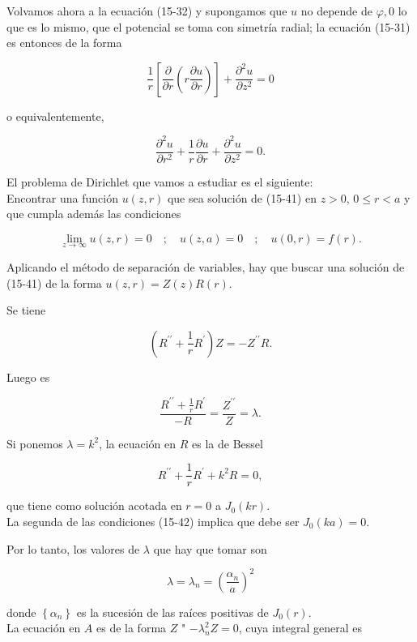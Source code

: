 \documentclass[10pt]{article}
\theoremstyle{plain}
\theoremstyle{definition}
\theoremstyle{remark}
\begin{document}
Volvamos ahora a la ecuación (15-32) y supongamos que $u$ no depende de $\varphi, 0$ lo que es lo mismo, que el potencial se toma con simetría radial; la ecuación (15-31) es entonces de la forma

$$
\frac{1}{r}\left[\frac{\partial}{\partial r}\left(r \frac{\partial u}{\partial r}\right)\right]+\frac{\partial^{2} u}{\partial z^{2}}=0
$$

o equivalentemente,


\begin{equation*}
\frac{\partial^{2} u}{\partial r^{2}}+\frac{1}{r} \frac{\partial u}{\partial r}+\frac{\partial^{2} u}{\partial z^{2}}=0 . \tag{15-41}
\end{equation*}


El problema de Dirichlet que vamos a estudiar es el siguiente:\\
Encontrar una función $u(z, r)$ que sea solución de (15-41) en $z>0$, $0 \leqslant r<a$ y que cumpla además las condiciones


\begin{equation*}
\lim _{z \rightarrow \infty} u(z, r)=0 \quad ; \quad u(z, a)=0 \quad ; \quad u(0, r)=f(r) . \tag{15-42}
\end{equation*}


Aplicando el método de separación de variables, hay que buscar una solución de (15-41) de la forma $u(z, r)=Z(z) R(r)$.

Se tiene

$$
\left(R^{\prime \prime}+\frac{1}{r} R^{\prime}\right) Z=-Z^{\prime \prime} R .
$$

Luego es

$$
\frac{R^{\prime \prime}+\frac{1}{r} R^{\prime}}{-R}=\frac{Z^{\prime \prime}}{Z}=\lambda .
$$

Si ponemos $\lambda=k^{2}$, la ecuación en $R$ es la de Bessel

$$
R^{\prime \prime}+\frac{1}{r} R^{\prime}+k^{2} R=0,
$$

que tiene como solución acotada en $r=0$ a $J_{0}(k r)$.\\
La segunda de las condiciones (15-42) implica que debe ser $J_{0}(k a)=0$.

Por lo tanto, los valores de $\lambda$ que hay que tomar son

$$
\lambda=\lambda_{n}=\left(\frac{\alpha_{n}}{a}\right)^{2}
$$

donde $\left\{\alpha_{n}\right\}$ es la sucesión de las raíces positivas de $J_{0}(r)$.\\
La ecuación en $A$ es de la forma $Z$ " $-\lambda_{n}^{2} Z=0$, cuya integral general es
\end{document}
